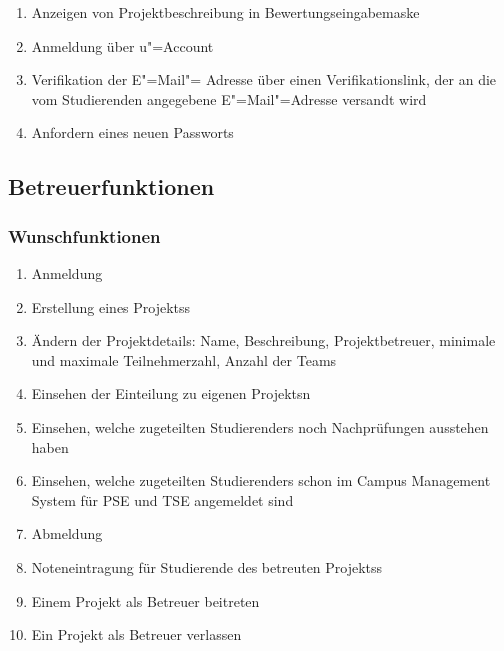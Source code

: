 \documentclass[parskip=full]{scrartcl}
\newcommand{\swtLabel}[1]{\textbf{/#1\arabic*0/}}
\begin{document}
\begin{enumerate}[label=\swtLabel{FA}, resume]
	\item Anzeigen von Projektbeschreibung in Bewertungseingabemaske
	\label{FAbeschreibung-Bewertung}
	\item Anmeldung über u"=Account \label{FAstudUanmeldung}%
	\item Verifikation der E"=Mail"= Adresse über einen Verifikationslink, der an die vom Studierenden angegebene E"=Mail"=Adresse versandt wird \label{FAemailverifikation}
	\item Anfordern eines neuen Passworts \label{FApasswortvergessen}
\end{enumerate}

\subsection{Betreuerfunktionen}
\subsubsection{Wunschfunktionen}

\begin{enumerate}[label=\swtLabel{FA}, resume]
  \item Anmeldung  \label{FAbetreueranmeldung}
  \item Erstellung eines \glspl{Projekt}s \label{FAbetreuer+projekt}
  \item Ändern der Projektdetails: Name, Beschreibung, Projektbetreuer,
        minimale und maximale Teilnehmerzahl, Anzahl der Teams
        \label{FAbetreuerProjektänderung}%
  \item Einsehen der Einteilung zu eigenen \glspl{Projekt}n
  \item Einsehen, welche zugeteilten \glspl{Studierender} noch Nachprüfungen ausstehen haben
  \item Einsehen, welche zugeteilten \glspl{Studierender} schon im Campus Management System für \gls{PSE} und TSE angemeldet sind 
  \label{FAbetreuereinsicht}
  \item Abmeldung \label{FAbetreuerabmeldung}
  \item Noteneintragung für Studierende des betreuten \glspl{Projekt}s
  \label{FAbetreuernoten}
  \item Einem \gls{Projekt} als Betreuer beitreten \label{FAjoinBetreuer}
  \item Ein \gls{Projekt} als Betreuer verlassen \label{FAleaveBetreuer}

\end{enumerate}
\end{document}
